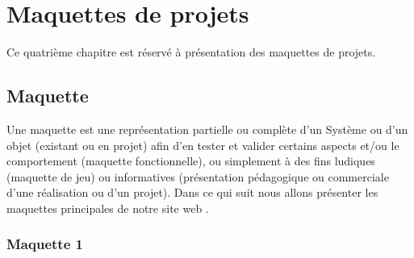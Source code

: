 \chapter{Maquettes de projets}
\vspace{5cm}
\large{Ce quatrième chapitre est réservé à présentation des maquettes de projets.\\}


\newpage
\section{Maquette}
Une maquette est une représentation partielle ou complète d'un Système ou d'un objet (existant ou en projet) afin d'en tester et valider certains aspects et/ou le comportement (maquette fonctionnelle), ou simplement à des fins ludiques (maquette de jeu) ou informatives (présentation pédagogique ou commerciale d'une réalisation
ou d'un projet). Dans ce qui suit nous allons présenter les maquettes principales de notre site web .

\subsection{Maquette 1}
\begin{page}{\textwidth}
	\begin{page}{\linewidth}
		\label{f3}%
\end{page}
\end{page}

